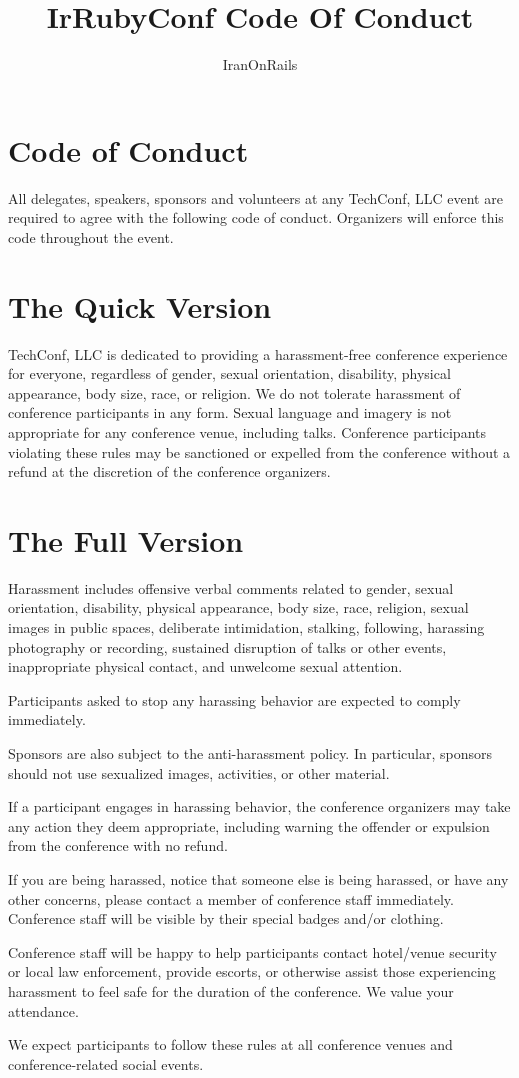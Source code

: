 \documentclass[a4paper,12pt]{book}
\author{IranOnRails}
\title{IrRubyConf Code Of Conduct}
\begin{document}
\maketitle


\section*{Code of Conduct}
All delegates, speakers, sponsors and volunteers at any TechConf, LLC event are
required to agree with the following code of conduct. Organizers will enforce this
code throughout the event.

\section*{The Quick Version}
TechConf, LLC is dedicated to providing a harassment-free conference experience for
everyone, regardless of gender, sexual orientation, disability, physical appearance,
body size, race, or religion. We do not tolerate harassment of conference participants
in any form. Sexual language and imagery is not appropriate for any conference venue,
including talks. Conference participants violating these rules may be sanctioned or
expelled from the conference without a refund at the discretion of the conference organizers.

\section*{The Full Version}
Harassment includes offensive verbal comments related to gender, sexual orientation,
disability, physical appearance, body size, race, religion, sexual images in public
spaces, deliberate intimidation, stalking, following, harassing photography or recording,
sustained disruption of talks or other events, inappropriate physical contact, and unwelcome
sexual attention.

Participants asked to stop any harassing behavior are expected to comply immediately.

Sponsors are also subject to the anti-harassment policy. In particular, sponsors should not
use sexualized images, activities, or other material.

If a participant engages in harassing behavior, the conference organizers may take any action
they deem appropriate, including warning the offender or expulsion from the conference with no refund.

If you are being harassed, notice that someone else is being harassed, or have any other concerns,
please contact a member of conference staff immediately. Conference staff will be visible by their
special badges and/or clothing.

Conference staff will be happy to help participants contact hotel/venue security or local law
enforcement, provide escorts, or otherwise assist those experiencing harassment to feel safe for
the duration of the conference. We value your attendance.

We expect participants to follow these rules at all conference venues and conference-related social events.
\end{document}
